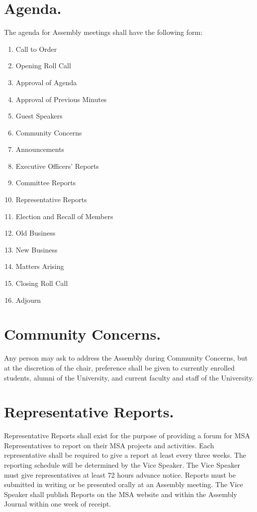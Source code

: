 \documentclass{rules}
\begin{document}
\section{Agenda.}
The agenda for Assembly meetings shall have the following form:
\begin{enumerate}
\item Call to Order
\item Opening Roll Call
\item Approval of Agenda
\item Approval of Previous Minutes
\item Guest Speakers
\item Community Concerns
\item Announcements
\item Executive Officers' Reports
\item Committee Reports
\item Representative Reports
\item Election and Recall of Members
\item Old Business
\item New Business
\item Matters Arising
\item Closing Roll Call
\item Adjourn
\end{enumerate}

\section{Community Concerns.}
Any person may ask to address the Assembly during Community Concerns, but at the discretion of the chair, preference shall be given to currently enrolled students, alumni of the University, and current faculty and staff of the University.

\section{Representative Reports.}
Representative Reports shall exist for the purpose of providing a forum for MSA Representatives to report on their MSA projects and activities.  Each representative shall be required to give a report at least every three weeks.  The reporting schedule will be determined by the Vice Speaker.  The Vice Speaker must give representatives at least 72 hours advance notice.  Reports must be submitted in writing or be presented orally at an Assembly meeting.  The Vice Speaker shall publish Reports on the MSA website and within the Assembly Journal within one week of receipt.
\end{document}
